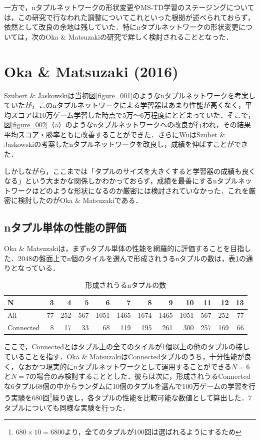 \documentclass{suribt}
\begin{document}
一方で，nタプルネットワークの形状変更やMS-TD学習のステージングについては，この研究で行なわれた調整についてこれといった根拠が述べられておらず，依然として改良の余地は残していた．特にnタプルネットワークの形状変更については，次のOka \& Matsuzakiの研究で詳しく検討されることとなった．

\section{Oka \& Matsuzaki (2016)}
Szubert \& Jaskowskiは当初図\ref{figure_001}のようなnタプルネットワークを考案していたが，このnタプルネットワークによる学習器はあまり性能が高くなく，平均スコアは10万ゲーム学習した時点で5万〜6万程度にとどまっていた．そこで，図\ref{figure_002}（a）のようなnタプルネットワークへの改良が行われ，その結果平均スコア・勝率ともに改善することができた．さらにWuはSzubet \& Jaskowskiの考案したnタプルネットワークを改良し，成績を伸ばすことができた．

しかしながら，ここまでは「タプルのサイズを大きくすると学習器の成績も良くなる」という大まかな関係しかわかっておらず，成績を最善にするnタプルネットワークはどのような形状になるのか厳密には検討されていなかった．これを厳密に検討したのがOka \& Matsuzakiである．

\subsection{nタプル単体の性能の評価}
Oka \& Matsuzakiは，まずnタプル単体の性能を網羅的に評価することを目指した．2048の盤面上でn個のタイルを選んで形成されうるnタプルの数は，表\ref{tab:ntuplesNumber}の通りとなっている．

\begin{table}[t]
	\begin{center}
		\caption{形成されうるnタプルの数}
		\begin{tabular}{l|r|r|r|r|r|r|r|r|r|r|r} \hline
		N & 3 & 4 & 5 & 6 & 7 & 8 & 9 & 10 & 11 & 12 & 13 \\ \hline \hline
		All & 77 & 252 & 567 & 1051 & 1465 & 1674 & 1465 & 1051 & 567 & 252 & 77 \\ \hline
		Connected & 8 & 17 & 33 & 68 & 119 & 195 & 261 & 300 & 257 & 169 & 66 \\ \hline
		\end{tabular}
		\label{tab:ntuplesNumber}
	\end{center}
\end{table}

ここで，Connectedとはタプル上の全てのタイルが1個以上の他のタプルの接していることを指す．Oka \& MatsuzakiはConnectedタプルのうち，十分性能が良く，なおかつ現実的にnタプルネットワークとして運用することができる$N=6$と$N=7$の場合のみ検討することとした．彼らは次に，形成されうるConnectedな6タプル68個の中からランダムに10個のタプルを選んで100万ゲームの学習を行う実験を680回\footnote{$680 \times 10 = 6800$より，全てのタプルが100回は選ばれるようにするため}繰り返し，各タプルの性能を比較可能な数値として算出した．7タプルについても同様な実験を行った．
\end{document}
